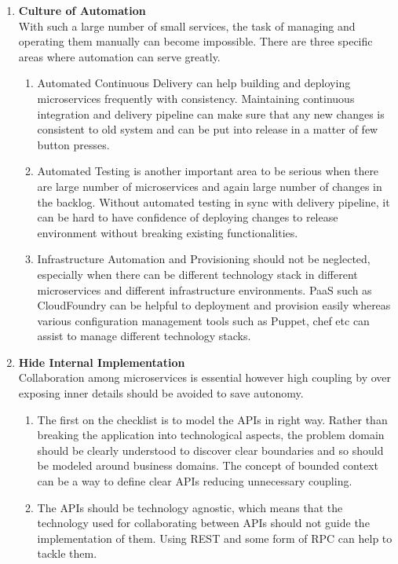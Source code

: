 \begin{enumerate}
\item \textbf{Culture of Automation}\\
With such a large number of small services, the task of managing and operating them manually can become impossible. There are three specific areas where automation can serve greatly.
\begin{enumerate}
\item Automated Continuous Delivery can help building and deploying microservices frequently with consistency. Maintaining continuous integration and delivery pipeline can make sure that any new changes is consistent to old system and can be put into release in a matter of few button presses.
\item Automated Testing is another important area to be serious when there are large number of microservices and again large number of changes in the backlog. Without automated testing in sync with delivery pipeline, it can be hard to have confidence of deploying changes to release environment without breaking existing functionalities.
\item Infrastructure Automation and Provisioning should not be neglected, especially when there can be different technology stack in different microservices and different infrastructure environments. \acrshort{PaaS} such as CloudFoundry can be helpful to deployment and provision easily whereas various configuration management tools such as Puppet, chef etc can assist to manage different technology stacks.
\end{enumerate}
\item \textbf{Hide Internal Implementation}\\
Collaboration among microservices is essential however high coupling by over exposing inner details should be avoided to save autonomy.
\begin{enumerate}
\item The first on the checklist is to model the \acrshort{API}s in right way. Rather than breaking the application into technological aspects, the problem domain should be clearly understood to discover clear boundaries and so should be modeled around business domains. The concept of bounded context can be a way to define clear \acrshort{API}s reducing unnecessary coupling.
\item The \acrshort{API}s should be technology agnostic, which means that the technology used for collaborating between \acrshort{API}s should not guide the implementation of them. Using \acrshort{REST} and some form of \acrshort{RPC} can help to tackle them.

\end{enumerate}
\end{enumerate}

